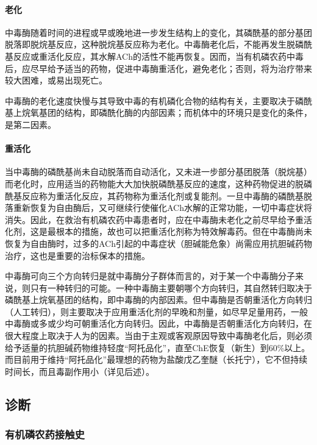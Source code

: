 \paragraph{老化}

中毒酶随着时间的进程或早或晚地进一步发生结构上的变化，其磷酰基的部分基团脱落即脱烷基反应，这种脱烷基反应称为老化。中毒酶老化后，不能再发生脱磷酰基反应或重活化反应，其水解ACh的活性不能再恢复。因而，当有机磷农药中毒后，应尽早给予适当的药物，促进中毒酶重活化，避免老化；否则，将为治疗带来较大困难，或易出现死亡。

中毒酶的老化速度快慢与其导致中毒的有机磷化合物的结构有关，主要取决于磷酰基上烷氧基团的结构，即磷酰化酶的内部因素；而机体中的环境只是变化的条件，是第二因素。

\paragraph{重活化}

当中毒酶的磷酰基尚未自动脱落而自动活化，又未进一步部分基团脱落（脱烷基）而老化时，应用适当的药物能大大加快脱磷酰基反应的速度，这种药物促进的脱磷酰基反应称为重活化反应，其药物称为重活化剂或复能剂。一旦中毒酶的磷酰基脱落重新恢复为自由酶后，又可继续行使催化ACh水解的正常功能，一切中毒症状将消失。因此，在救治有机磷农药中毒患者时，应在中毒酶未老化之前尽早给予重活化剂，这是最根本的措施，故也可以把重活化剂称为特效解毒药。但在中毒酶尚未恢复为自由酶时，过多的ACh引起的中毒症状（胆碱能危象）尚需应用抗胆碱药物治疗，这也是重要的治标保本的措施。

中毒酶可向三个方向转归是就中毒酶分子群体而言的，对于某一个中毒酶分子来说，则只有一种转归的可能。一种中毒酶主要朝哪个方向转归，其自然转归取决于磷酰基上烷氧基团的结构，即中毒酶的内部因素。但中毒酶是否朝重活化方向转归（人工转归），则主要取决于应用重活化剂的早晚和剂量，如尽早足量用药，一般中毒酶或多或少均可朝重活化方向转归。因此，中毒酶是否朝重活化方向转归，在很大程度上取决于人为的因素。当由于主观或客观原因导致中毒酶老化后，则必须给予适量的抗胆碱药物维持轻度“阿托品化”，直至ChE恢复（新生）到60\%以上。而目前用于维持“阿托品化”最理想的药物为盐酸戊乙奎醚（长托宁），它不但持续时间长，而且毒副作用小（详见后述）。

\subsection{诊断}

\subsubsection{有机磷农药接触史}

